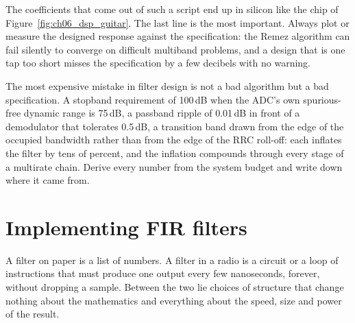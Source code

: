 The coefficients that come out of such a script end up in silicon like the chip of
Figure~\ref{fig:ch06_dsp_guitar}. The last line is the most important. Always plot or measure the designed response against the
specification: the Remez algorithm can fail silently to converge on difficult multiband problems,
and a design that is one tap too short misses the specification by a few decibels with no warning.


\begin{pitfall}
The most expensive mistake in filter design is not a bad algorithm but a bad specification. A
stopband requirement of 100\,dB when the ADC's own spurious-free dynamic range is 75\,dB, a passband
ripple of 0.01\,dB in front of a demodulator that tolerates 0.5\,dB, a transition band drawn from
the edge of the occupied bandwidth rather than from the edge of the RRC roll-off: each inflates the
filter by tens of percent, and the inflation compounds through every stage of a multirate chain.
Derive every number from the system budget and write down where it came from.
\end{pitfall}

\section{Implementing FIR filters}
\label{sec:ch06:firimpl}

A filter on paper is a list of numbers. A filter in a radio is a circuit or a loop of
instructions that must produce one output every few nanoseconds, forever, without dropping a
sample. Between the two lie choices of structure that change nothing about the mathematics and
everything about the speed, size and power of the result.

